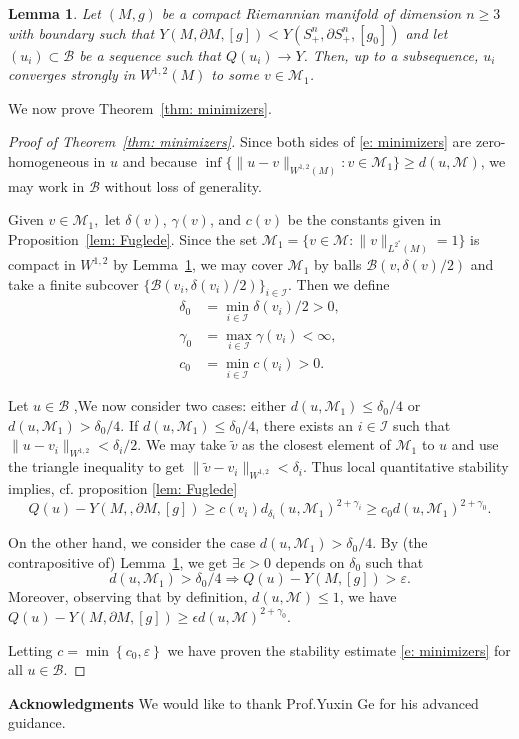 \documentclass[12pt]{amsart}
\newtheorem{lemma}[theorem]{Lemma}
\newcommand{\e}{{\epsilon}}
\newcommand{\g}{{\gamma}}
\newcommand{\M}{{\mathcal{M}}}
\newcommand{\B}{\mathcal{B}}
\begin{document}
\begin{lemma}\label{lem: cpt}
	Let $(M,g)$ be a compact Riemannian manifold of dimension $n\geq 3$ with boundary such that $Y(M,\partial M,[g]) < Y(S^n_+,\partial S^n_+,[g_0]) $ and let $(u_i)\subset \B$ be a sequence such that $Q(u_i) \to Y$.  Then, up to a subsequence, $u_i$ converges strongly in $W^{1,2}(M)$ to some $v \in \mathcal{M}_1$. 
\end{lemma}
We now prove Theorem~\ref{thm: minimizers}.
\begin{proof}[Proof of Theorem~\ref{thm: minimizers}]
Since both sides of \eqref{e: minimizers} are zero-homogeneous in $u$ and because  $\inf\{ \| u -v\|_{W^{1,2}(M)} : v\in \M_1\} \geq d(u, \M)$,  we may work in $\B$ without loss of generality.

Given $v \in \M_1,$ let $\delta(v)$,  $\g(v)$, and $c(v)$ be the constants given in Proposition~\ref{lem: Fuglede}.
Since the set $\M_1 = \{  v \in \M : \| v\|_{L^{2^*}(M)}=1\}$ is compact in $W^{1,2}$ by Lemma~\ref{lem: cpt}, we may cover $\M_1$ by balls $\B(v, \delta(v)/2)$ and take a finite subcover $\{\B(v_i, \delta(v_i)/2)\}_{i\in \mathscr I}$. Then we define
\begin{align*}
\delta_0 &= \min_{i\in \mathscr I} \delta(v_i)/2 > 0,\\
\g_0 & = \max_{i\in \mathscr I}  \g(v_i)< \infty,\\
c_0 & = \min_{i\in \mathscr I}  c(v_i) >0.
\end{align*}

Let $u\in \B$ ,We now consider two cases:  either $d(u, \mathcal{M}_1) \leq \delta_0/4$ or $d(u, \mathcal{M}_1) > \delta_0/4$.
If $d(u, \mathcal{M}_1) \leq \delta_0/4$,  
there exists an $i \in \mathscr I$ such that $\|u -v_i\|_{W^{1,2}} < \delta_i/2$. We may take $\tilde{v}$ as the closest element of $\M_1$ to $u$ and use the triangle inequality to get  $\|\tilde{v}-v_i\|_{W^{1,2}} < \delta_i$. Thus local quantitative stability implies, cf. proposition \ref{lem: Fuglede}
$$Q(u) - Y(M,,\partial M,[g]) \geq c(v_i)d_{\delta_i}(u, \mathcal{M}_1)^{2+\g_i} \geq c_0d(u, \mathcal M_1)^{2+ \g_0}.
$$ 

On the other hand, we consider the case $d(u, \mathcal M_1) > \delta_0/4$. By (the contrapositive of) Lemma~\ref{lem: cpt}, we get $\exists \e>0$ depends on $\delta_0$ such that
\begin{equation}
    d(u, \mathcal M_1) > \delta_0/4 \Rightarrow Q(u)-Y(M,[g]) > \varepsilon.
\end{equation}
Moreover, observing that by definition, $d(u, \mathcal M) \leq  1$, we have $Q(u)-Y(M,\partial M,[g]) \ge \epsilon d(u, \M)^{2+\gamma_0}$.

 Letting $c = \min\left\{c_0, \varepsilon\right\}$ we have proven the stability estimate \eqref{e: minimizers} for all $u \in \B$. 

\end{proof}
\textbf{Acknowledgments}
 \quad We would like to thank Prof.Yuxin Ge for his advanced guidance. 
\end{document}
